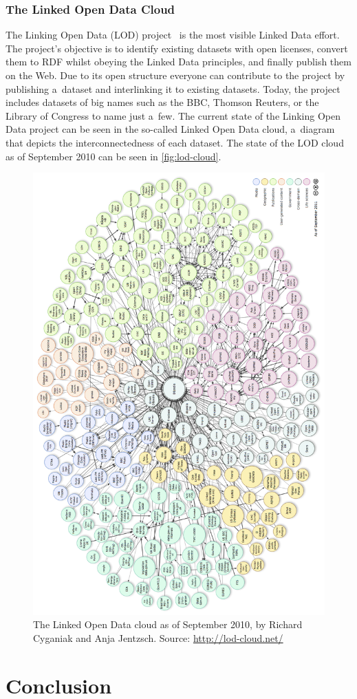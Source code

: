 \subsubsection{The Linked Open Data Cloud}\label{sec:lodcloud}
The Linking Open Data (LOD) project~\cite{Bizer2011} is the most visible Linked Data effort.
The project's objective is to identify existing datasets with open licenses,
convert them to RDF whilst obeying the Linked Data principles, and finally publish them on the Web.
Due to its open structure everyone can contribute to the project by publishing a~dataset and
interlinking it to existing datasets.
Today, the project includes datasets of big names such as the BBC, Thomson Reuters,
or the Library of Congress to name just a~few.
The current state of the Linking Open Data project can be seen in the so-called Linked Open Data cloud,
a~diagram that depicts the interconnectedness of each dataset.
The state of the LOD cloud as of September 2010 can be seen in \autoref{fig:lod-cloud}.

\begin{figure}[htbp!]
\begin{center}
  \includegraphics[width=1.0\textwidth]{lod-cloud.png}    
  \caption[The Linked Open Data cloud as of September 2010.]{The Linked Open Data cloud as of September 2010, by Richard Cyganiak and Anja Jentzsch. Source: \url{http://lod-cloud.net/}}    
  \label{fig:lod-cloud}
  \end{center}  
\end{figure}

\section{Conclusion}